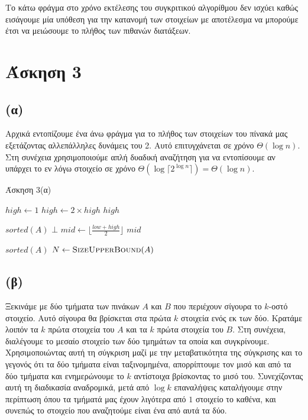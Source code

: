 \documentclass[11pt,a4paper]{book}
\begin{document}
Το κάτω φράγμα στο χρόνο εκτέλεσης του συγκριτικού αλγορίθμου δεν ισχύει καθώς εισάγουμε μία υπόθεση για την κατανομή των στοιχείων με αποτέλεσμα να μπορούμε έτσι να μειώσουμε το πλήθος των πιθανών διατάξεων.

\section*{Άσκηση 3}

\subsection*{(α)}
Αρχικά εντοπίζουμε ένα άνω φράγμα για το πλήθος των στοιχείων του πίνακά μας εξετάζοντας αλλεπάλληλες δυνάμεις του 2. Αυτό επιτυγχάνεται σε χρόνο $\Theta( \log n )$. Στη συνέχεια χρησιμοποιούμε απλή δυαδική αναζήτηση για να εντοπίσουμε αν υπάρχει το εν λόγω στοιχείο σε χρόνο $\Theta( \log \lceil 2^{\log n} \rceil ) = \Theta( \log n )$.

\begin{algorithm}[H]
\caption{\textgreek{Άσκηση 3(α)}}
\begin{algorithmic}[1]
    \State $high \gets 1$
        \State $high \gets 2 \times high$
    \EndWhile
    \State \Return $high$
\EndProcedure

\Require $sorted(A)$
    	\State \Return $\bot$
    \EndIf
    \State $mid \gets \lfloor \frac{low + high}{2} \rfloor$
        \State \Return $mid$
    \EndIf
        \State \Return {}
    \EndIf
        \State \Return {}
	\EndIf
\EndProcedure

\Require $sorted(A)$
	\State $N \gets \Call{SizeUpperBound}{A}$
    \State \Return 
\EndProcedure
\end{algorithmic}
\end{algorithm}
    
\subsection*{(β)}
Ξεκινάμε με δύο τμήματα των πινάκων $A$ και $B$ που περιέχουν σίγουρα το $k$-οστό στοιχείο. Αυτό σίγουρα θα βρίσκεται στα πρώτα $k$ στοιχεία ενός εκ των δύο. Κρατάμε λοιπόν τα $k$ πρώτα στοιχεία του $A$ και τα $k$ πρώτα στοιχεία του $B$. Στη συνέχεια, διαλέγουμε το μεσαίο στοιχείο των δύο τμημάτων τα οποία και συγκρίνουμε. Χρησιμοποιώντας αυτή τη σύγκριση μαζί με την μεταβατικότητα της σύγκρισης και το γεγονός ότι τα δύο τμήματα είναι ταξινομημένα, απορρίπτουμε τον μισό και από τα δύο τμήματα και ενημερώνουμε το $k$ αντίστοιχα βρίσκοντας το μισό του. Συνεχίζοντας αυτή τη διαδικασία αναδρομικά, μετά από $\log k$ επαναλήψεις καταλήγουμε στην περίπτωση όπου τα τμήματά μας έχουν λιγότερα από $1$ στοιχείο το καθένα, και συνεπώς το στοιχείο που αναζητούμε είναι ένα από αυτά τα δύο.
\end{document}

